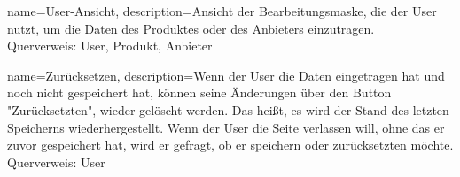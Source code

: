 {
  name=User-Ansicht,
  description={Ansicht der Bearbeitungsmaske, die der User nutzt, um die Daten des Produktes oder des Anbieters einzutragen. \\ Querverweis: User, Produkt, Anbieter}
}

{
  name=Zurücksetzen,
  description={Wenn der User die Daten eingetragen hat und noch nicht gespeichert hat, können seine Änderungen über den Button "Zurücksetzten", wieder gelöscht werden. Das heißt, es wird der Stand des letzten Speicherns wiederhergestellt. Wenn der User die Seite verlassen will, ohne das er zuvor gespeichert hat, wird er gefragt, ob er speichern oder zurücksetzten möchte. \\ Querverweis: User}
}

 
\renewcommand*{\glossaryname}{\section{\glossarName}}

\glsaddall
\printglossaries

